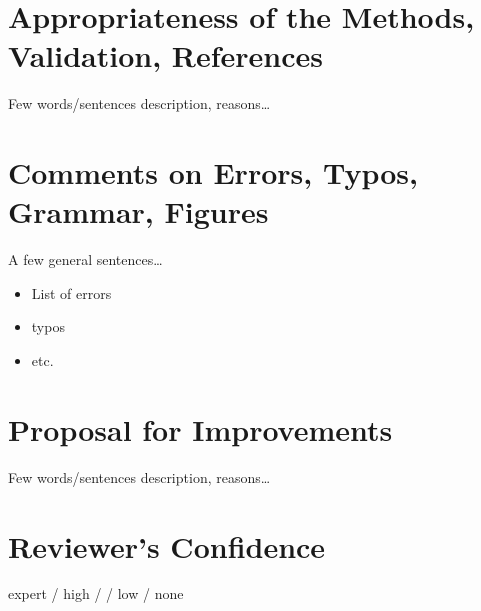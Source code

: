 \documentclass[a4paper,12pt]{article}
\begin{document}
\section{Appropriateness of the Methods,\\ Validation, References}

Few words/sentences description, reasons\dots  %


\section{Comments on Errors, Typos, Grammar, Figures}

A few general sentences\dots

\begin{itemize}
\item List of errors
\item typos
\item etc.
\end{itemize}


\section{Proposal for Improvements}

Few words/sentences description, reasons\dots  %


\section{Reviewer's Confidence}

expert / high /  / low / none




\end{document}
